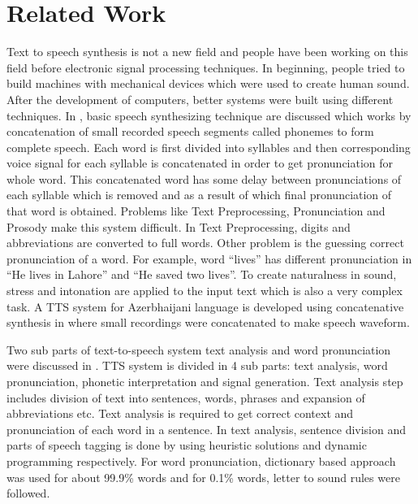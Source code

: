 \chapter{Related Work}

Text to speech synthesis is not a new field and people have been working on this field before electronic signal processing techniques. In beginning, people tried to build machines with mechanical devices which were used to create human sound. After the development of computers, better systems were built using different techniques. In \cite{swetha2013text}, basic speech synthesizing technique are discussed which works by concatenation of small recorded speech segments called phonemes to form complete speech. Each word is first divided into syllables and then corresponding voice signal for each syllable is concatenated in order to get pronunciation for whole word. This concatenated word has some delay between pronunciations of each syllable which is removed and as a result of which final pronunciation of that word is obtained. Problems like Text Preprocessing, Pronunciation and Prosody make this system difficult. In Text Preprocessing, digits and abbreviations are converted to full words. Other problem is the guessing correct pronunciation of a word. For example, word “lives” has different pronunciation in “He lives in Lahore” and “He saved two lives”. To create naturalness in sound, stress and intonation are applied to the input text which is also a very complex task. A TTS system for Azerbhaijani language is developed using concatenative synthesis in \cite{aida2010main} where small recordings were concatenated to make speech waveform.

Two sub parts of text-to-speech system text analysis and word pronunciation were discussed in \cite{liberman1992text}. TTS system is divided in 4 sub parts: text analysis, word pronunciation, phonetic interpretation and signal generation. Text analysis step includes division of text into sentences, words, phrases and expansion of abbreviations etc. Text analysis is required to get correct context and pronunciation of each word in a sentence. In text analysis, sentence division and parts of speech tagging is done by using heuristic solutions \cite{riley1989some} and dynamic programming respectively. For word pronunciation, dictionary based approach was used for about 99.9\%
words and for 0.1\% words, letter to sound rules were followed. 

